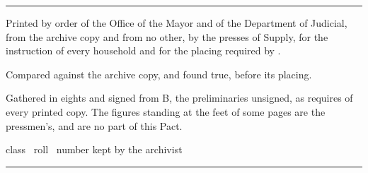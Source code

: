 
\cleardoublepage
\pagestyle{empty}
\vspace*{\fill}
\begin{center}
\begin{minipage}{3.3in}
\centering
\footnotesize

\rule{1.4in}{0.4pt}

\vspace{14pt}

Printed by order of the Office of the Mayor and of the Department of Judicial,
from the archive copy and from no other, by the presses of Supply, for the
instruction of every household and for the placing required by
.

\vspace{10pt}

Compared against the archive copy, and found true, before its placing.

\vspace{10pt}

Gathered in eights and signed from B, the preliminaries unsigned, as
 requires of
every printed copy. The figures standing at the feet of some pages are the
pressmen's, and are no part of this Pact.

\vspace{10pt}

{\ttfamily\scriptsize class \textperiodcentered\ roll \textperiodcentered\ number kept by the archivist}

\vspace{14pt}

\rule{1.4in}{0.4pt}
\end{minipage}
\end{center}
\vspace*{\fill}
